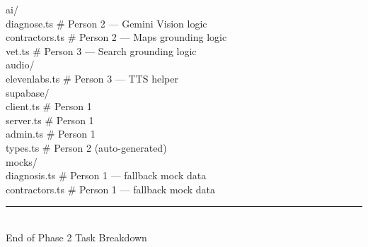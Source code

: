 \documentclass[11pt, a4paper]{article}
\begin{document}
\begin{codebox}
\quad\quad ai/\\
\quad\quad\quad diagnose.ts \quad\quad\quad\quad\quad\quad\# Person 2 --- Gemini Vision logic\\
\quad\quad\quad contractors.ts \quad\quad\quad\quad\quad\# Person 2 --- Maps grounding logic\\
\quad\quad\quad vet.ts \quad\quad\quad\quad\quad\quad\quad\quad\# Person 3 --- Search grounding logic\\
\quad\quad audio/\\
\quad\quad\quad elevenlabs.ts \quad\quad\quad\quad\quad\# Person 3 --- TTS helper\\
\quad\quad supabase/\\
\quad\quad\quad client.ts \quad\quad\quad\quad\quad\quad\quad\# Person 1\\
\quad\quad\quad server.ts \quad\quad\quad\quad\quad\quad\quad\# Person 1\\
\quad\quad\quad admin.ts \quad\quad\quad\quad\quad\quad\quad\quad\# Person 1\\
\quad\quad\quad types.ts \quad\quad\quad\quad\quad\quad\quad\quad\# Person 2 (auto-generated)\\
\quad\quad mocks/\\
\quad\quad\quad diagnosis.ts \quad\quad\quad\quad\quad\quad\# Person 1 --- fallback mock data\\
\quad\quad\quad contractors.ts \quad\quad\quad\quad\quad\# Person 1 --- fallback mock data\\
\end{codebox}

\vspace{2em}

\begin{center}
\textcolor{textmuted}{\rule{0.4\textwidth}{0.4pt}}\\[6pt]
\textcolor{textmuted}{\small End of Phase 2 Task Breakdown}
\end{center}
\end{document}
